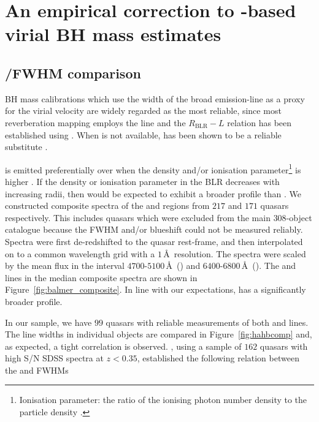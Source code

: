 \section[Correction to \ion{C}{IV}-based BH masses]{An empirical correction to -based virial BH mass estimates}

\subsection{\hans/\hb FWHM comparison}
\label{sec:hahbcomparison}

BH mass calibrations which use the width of the broad \hb emission-line as a proxy for the virial velocity are widely regarded as the most reliable, since most reverberation mapping employs the \hb line and the $R_{\text{BLR}}-L$ relation has been established using \hbns.
When \hb is not available, \ha has been shown to be a reliable substitute \citep[e.g.][]{greene05b,shen11,shen12}. 

\hb is emitted preferentially over \ha when the density and/or ionisation parameter\footnote{Ionisation parameter: the ratio of the ionising photon number density to the particle density \citep[e.g.][]{peterson97}.} is higher \citep[e.g.][]{osterbrock89}. 
If the density or ionisation parameter in the BLR decreases with increasing radii, then \hb would be expected to exhibit a broader profile than \ha \citep[e.g.][]{greene05b}. 
We constructed composite spectra of the \ha and \hb regions from $217$ and $171$ quasars respectively. 
This includes quasars which were excluded from the main $308$-object catalogue because the  FWHM and/or blueshift could not be measured reliably. 
Spectra were first de-redshifted to the quasar rest-frame, and then interpolated on to a common wavelength grid with a $1$\,\AA\, resolution. 
The spectra were scaled by the mean flux in the interval $4700$-$5100$\,\AA\, (\hbns) and $6400$-$6800$\,\AA\, (\hans). 
The \ha and \hb lines in the median composite spectra are shown in Figure~\ref{fig:balmer_composite}.
In line with our expectations, \hb has a significantly broader profile. 

In our sample, we have $99$ quasars with reliable measurements of both \ha and \hb lines. 
The line widths in individual objects are compared in Figure~\ref{fig:hahbcomp} and, as expected, a tight correlation is observed.  
\citet{greene05b}, using a sample of $162$ quasars with high S/N SDSS spectra at $z < 0.35$, established the following relation between the \ha and \hb FWHMs

